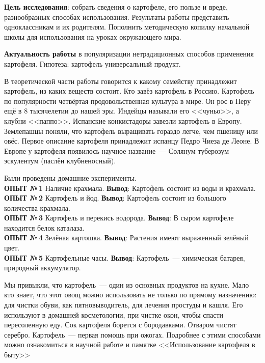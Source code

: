 


\makeProcTitleSchool


\textbf{Цель исследования}: собрать сведения о картофеле, его пользе и вреде, разнообразных способах использования. Результаты работы представить одноклассникам и их родителям. Пополнить методическую копилку начальной школы для использования на уроках окружающего мира.

\textbf{Актуальность работы} в популяризации нетрадиционных способов применения картофеля. Гипотеза: картофель универсальный продукт.

В теоретической части работы говорится к какому семейству принадлежит картофель, из каких веществ состоит.	Кто завёз картофель в Россию. Картофель по популярности четвёртая продовольственная культура в мире. Он рос в Перу ещё в 8 тысячелетии до нашей эры. Индейцы называли его <<чуньо>>, а клубни <<паппо>>. Испанские конкистадоры завезли картофель в Европу.  Землепашцы поняли, что картофель выращивать гораздо легче, чем пшеницу или овёс. Первое описание картофеля принадлежит испанцу Педро Чиеза де Леоне.  В Европе у картофеля появилось научное название~--- Солянум туберозум эскулентум (паслён клубненосный).

Были проведены домашние эксперименты.\\
\textbf{ОПЫТ №\,1} Наличие крахмала. \textbf{Вывод}: Картофель состоит из воды и крахмала.\\
\textbf{ОПЫТ №\,2} Картофель и йод. \textbf{Вывод}: Картофель состоит из большого количества крахмала.\\
\textbf{ОПЫТ №\,3} Картофель и перекись водорода. \textbf{Вывод}: В сыром картофеле находится белок каталаза.\\
\textbf{ОПЫТ №\,4} Зелёная картошка. \textbf{Вывод}: Растения имеют выраженный зелёный цвет.\\
\textbf{ОПЫТ №\,5} Картофельные часы.	\textbf{Вывод}: Картофель~--- химическая батарея, природный  аккумулятор.

Мы привыкли, что картофель~--- один из основных продуктов на кухне. Мало кто знает, что этот овощ можно использовать не только по прямому назначению: для чистки обуви, как пятновыводитель, для лечения простуды и кашля. Его используют в домашней косметологии, при чистке окон, чтобы спасти пересоленную еду. Сок картофеля борется с бородавками. Отваром чистят серебро. Картофель~--- первая помощь при ожогах. Подробнее с этими способами можно ознакомиться в научной работе и памятке <<Использование картофеля в быту>>

